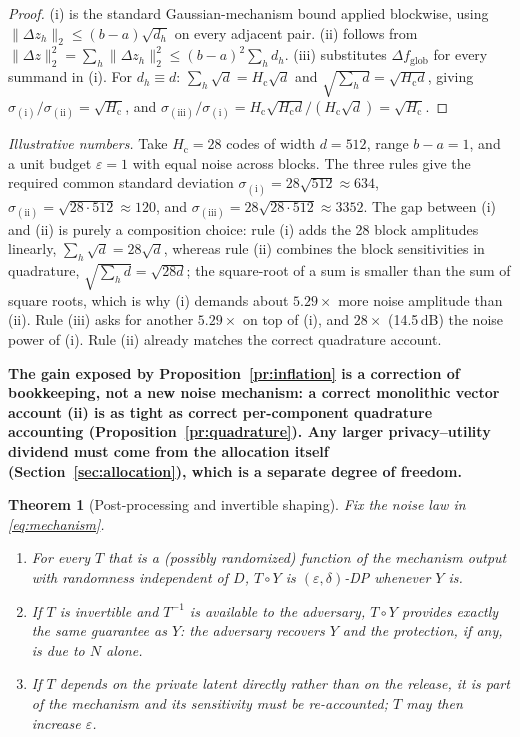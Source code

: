\documentclass[10pt,twocolumn,letterpaper]{article}
\theoremstyle{plain}
\newtheorem{theorem}{Theorem}
\theoremstyle{definition}
\begin{document}
\begin{proof}
(i) is the standard Gaussian-mechanism bound applied blockwise, using
$\|\Delta z_h\|_2\le(b-a)\sqrt{d_h}$ on every adjacent pair.
(ii) follows from $\|\Delta z\|_2^2=\sum_h\|\Delta z_h\|_2^2
\le(b-a)^2\sum_h d_h$. (iii) substitutes $\Delta f_{\mathrm{glob}}$ for every
summand in (i). For $d_h\equiv d$:
$\sum_h\sqrt d=H_{\mathrm c}\sqrt d$ and
$\sqrt{\sum_h d}=\sqrt{H_{\mathrm c}d}$, giving
$\sigma_{\mathrm{(i)}}/\sigma_{\mathrm{(ii)}}=\sqrt{H_{\mathrm c}}$, and
$\sigma_{\mathrm{(iii)}}/\sigma_{\mathrm{(i)}}=
H_{\mathrm c}\sqrt{H_{\mathrm c}d}/(H_{\mathrm c}\sqrt d)=\sqrt{H_{\mathrm c}}$.
\end{proof}

\emph{Illustrative numbers.} Take $H_{\mathrm c}=28$ codes of width
$d=512$, range $b-a=1$, and a unit budget $\varepsilon=1$ with equal noise
across blocks. The three rules give the required common standard deviation
$\sigma_{\mathrm{(i)}}=28\sqrt{512}\approx634$,
$\sigma_{\mathrm{(ii)}}=\sqrt{28\cdot512}\approx120$, and
$\sigma_{\mathrm{(iii)}}=28\sqrt{28\cdot512}\approx3352$. The gap between
(i) and (ii) is purely a composition choice: rule (i) adds the 28 block
amplitudes linearly, $\sum_h\sqrt d=28\sqrt d$, whereas rule (ii) combines the
block sensitivities in quadrature, $\sqrt{\sum_h d}=\sqrt{28d}$; the square-root
of a sum is smaller than the sum of square roots, which is why (i) demands about
$5.29\times$ more noise amplitude than (ii). Rule (iii) asks for another
$5.29\times$ on top of (i), and $28\times$ (14.5\,dB) the noise power of (i).
Rule (ii) already matches the correct quadrature account.

\textbf{The gain exposed by Proposition~\ref{pr:inflation} is a correction of
bookkeeping, not a new noise mechanism: a correct monolithic vector account
(ii) is as tight as correct per-component quadrature accounting
(Proposition~\ref{pr:quadrature}). Any larger privacy--utility dividend must
come from the allocation itself (Section~\ref{sec:allocation}), which is a
separate degree of freedom.}

\begin{theorem}[Post-processing and invertible shaping]
\label{th:postproc}
Fix the noise law in \eqref{eq:mechanism}.
\begin{enumerate}
\item[(i)] For every $T$ that is a (possibly randomized) function of the
mechanism output with randomness independent of $D$, $T\circ Y$ is
$(\varepsilon,\delta)$-DP whenever $Y$ is.
\item[(ii)] If $T$ is invertible and $T^{-1}$ is available to the adversary,
$T\circ Y$ provides exactly the same guarantee as $Y$: the adversary recovers
$Y$ and the protection, if any, is due to $N$ alone.
\item[(iii)] If $T$ depends on the private latent directly rather than on the
release, it is part of the mechanism and its sensitivity must be re-accounted;
$T$ may then \emph{increase} $\varepsilon$.
\end{enumerate}
\end{theorem}
\end{document}
